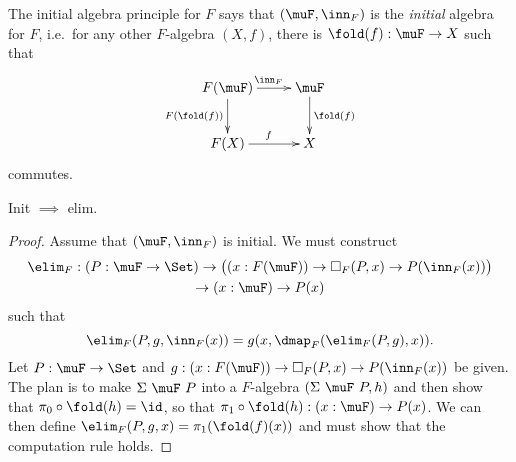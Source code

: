 \documentclass{article}
\begin{document}
\begin{principle}[Init]
  The initial algebra principle for $F$ says that $(\muF, \inn_F)$ is
  the \emph{initial} algebra for $F$, i.e.\ for any other $F$-algebra
  $(X, f)$, there is $\fold(f) : \muF \to X$ such that
\[
\xymatrix
{
F(\muF) \ar^{\inn_F}[r] \ar_{F(\fold(f))}[d] & \muF \ar^{\fold(f)}[d]\\
F(X) \ar^{f}[r] & X
}
\]
commutes.
\end{principle}

\begin{problem}
  Init $\implies$ elim.
\end{problem}
\begin{proof}
  Assume that $(\muF, \inn_F)$ is initial. We must construct
\begin{multline*}
\elim_F : (P : \muF \to \Set) \to \big( (x : F(\muF)) \to \square_F(P, x) \to P(\inn_F(x))\big) \\ \to (x : \muF) \to P(x)
\end{multline*}
such that
\[
\elim_F(P, g, \inn_F(x)) = g(x, \dmap_F(\elim_F(P, g), x)).
\]
Let $P : \muF \to \Set$ and $g : (x : F(\muF)) \to \square_F(P, x) \to
P(\inn_F(x))$ be given. The plan is to make $\Sigma\ \muF\ P$ into a
$F$-algebra $(\Sigma\ \muF\ P, h)$ and then show that $\pi_0 \circ
\fold(h) = \id$, so that $\pi_1 \circ \fold(h) : (x : \muF) \to
P(x)$. We can then define $\elim_F(P, g, x) = \pi_1(\fold(f)(x))$ and
must show that the computation rule holds.


\end{proof}
\end{document}
